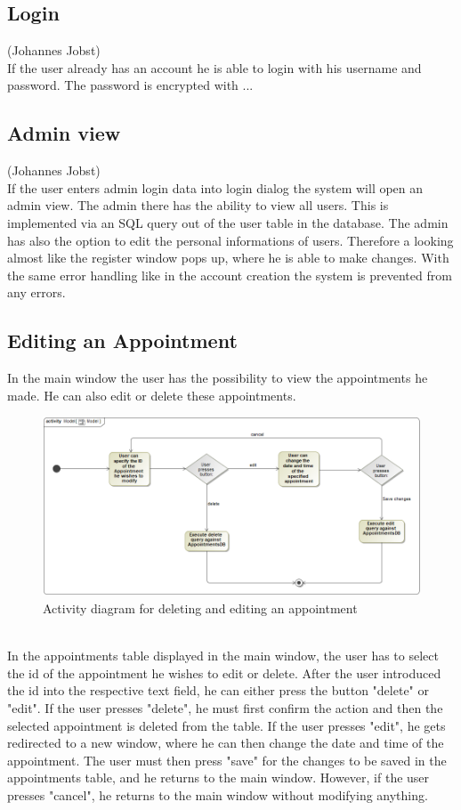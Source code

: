 \documentclass[a4paper, 12pt]{report}
\begin{document}
\subsection{Login}
{\tiny (Johannes Jobst)\\}
If the user already has an account he is able to login with his username and password. The password is encrypted with ...

\subsection{Admin view}
{\tiny (Johannes Jobst)\\}
If the user enters admin login data into login dialog the system will open an admin view. The admin there has the ability to view all users. This is implemented via an SQL query out of the user table in the database. The admin has also the option to edit the personal informations of users. Therefore a looking almost like the register window pops up, where he is able to make changes.
With the same error handling like in the account creation the system is prevented from any errors.


\subsection{Editing an Appointment}
In the main window the user has the possibility to view the appointments he made. He can also edit or delete these appointments.
\begin{figure}[!h]
\includegraphics[width=\linewidth]{acImg.png} 
\caption{Activity diagram for deleting and editing an appointment}
\end{figure}
\\In the appointments table displayed in the main window, the user has to select the id of the appointment he wishes to edit or delete. After the user introduced the id into the respective text field, he can either press the button "delete" or "edit". If the user presses "delete", he must first confirm the action and then the selected appointment is deleted from the table. If the user presses "edit", he gets redirected to a new window, where he can then change the date and time of the appointment. The user must then press "save" for the changes to be saved in the appointments table, and he returns to the main window. However, if the user presses "cancel", he returns to the main window without modifying anything.
\end{document}
